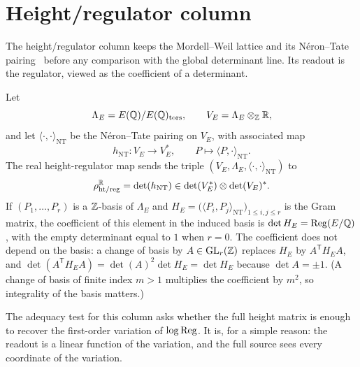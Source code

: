 \section{Height/regulator column}
\label{sec:height-regulator}

The height/regulator column keeps the Mordell--Weil lattice and its
N\'eron--Tate pairing~\citep{Neron1965,Silverman2009} before any comparison
with the global determinant line.  Its readout is the regulator, viewed as
the coefficient of a determinant.

\begin{definition}\label{def:apparatus:height-regulator-map}
Let
\[
  \Lambda_E=E(\mathbb{Q})/E(\mathbb{Q})_{\operatorname{tors}},
  \qquad
  V_E=\Lambda_E\otimes_{\mathbb{Z}}\mathbb{R},
\]
and let $\langle\cdot,\cdot\rangle_{\mathrm{NT}}$ be the N\'eron--Tate
pairing on $V_E$, with associated map
\[
  h_{\mathrm{NT}}:V_E\longrightarrow V_E^*,
  \qquad
  P\longmapsto \langle P,\cdot\rangle_{\mathrm{NT}}.
\]
The real height-regulator map sends the triple
$(V_E,\Lambda_E,\langle\cdot,\cdot\rangle_{\mathrm{NT}})$ to
\[
  \rho_{\mathrm{ht/reg}}^{\mathbb{R}}
  =\det(h_{\mathrm{NT}})\in\det(V_E^*)\otimes\det(V_E)^*.
\]
If $(P_1,\ldots,P_r)$ is a $\mathbb{Z}$-basis of $\Lambda_E$ and
$H_E=\bigl(\langle P_i,P_j\rangle_{\mathrm{NT}}\bigr)_{1\le i,j\le r}$ is
the Gram matrix, the coefficient of this element in the induced basis is
$\det H_E=\operatorname{Reg}(E/\mathbb{Q})$, with the empty determinant equal to $1$ when $r=0$.
The coefficient does not depend on the basis: a change of basis by
$A\in\mathrm{GL}_r(\mathbb{Z})$ replaces $H_E$ by $A^{\mathsf T}H_EA$, and
$\det(A^{\mathsf T}H_EA)=\det(A)^2\det H_E=\det H_E$ because
$\det A=\pm1$.  (A change of basis of finite index $m>1$ multiplies the
coefficient by $m^2$, so integrality of the basis matters.)
\end{definition}

The adequacy test for this column asks whether the full height matrix is
enough to recover the first-order variation of $\log\operatorname{Reg}$.  It is, for a
simple reason: the readout is a linear function of the variation, and the
full source sees every coordinate of the variation.

